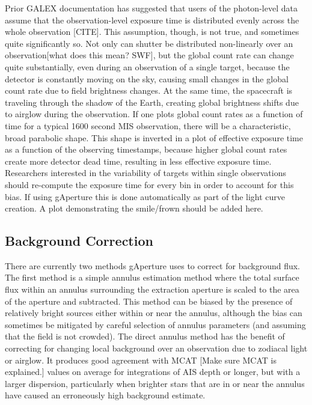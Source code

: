 \documentclass[5p]{elsarticle}
\begin{document}
Prior GALEX documentation has suggested that users of the photon-level data assume that the observation-level exposure time is distributed evenly across the whole observation {\color{red}[CITE]}. This assumption, though, is not true, and sometimes quite significantly so. Not only can shutter be distributed non-linearly over an observation{\color{red}[what does this mean? SWF]}, but the global count rate can change quite substantially, even during an observation of a single target, because the detector is constantly moving on the sky, causing small changes in the global count rate due to field brightness changes.  At the same time, the spacecraft is traveling through the shadow of the Earth, creating global brightness shifts due to airglow during the observation. If one plots global count rates as a function of time for a typical 1600 second MIS observation, there will be a characteristic, broad parabolic shape.  This shape is inverted in a plot of effective exposure time as a function of the observing timestamps, because higher global count rates create more detector dead time, resulting in less effective exposure time.  Researchers interested in the variability of targets within single observations should re-compute the exposure time for every bin in order to account for this bias.  If using gAperture this is done automatically as part of the light curve creation.  {\color{red}A plot demonstrating the smile/frown should be added here.}

\subsection{Background Correction}
There are currently two methods gAperture uses to correct for background flux.  The first method is a simple annulus estimation method where the total surface flux within an annulus surrounding the extraction aperture is scaled to the area of the aperture and subtracted. This method can be biased by the presence of relatively bright sources either within or near the annulus, although the bias can sometimes be mitigated by careful selection of annulus parameters (and assuming that the field is not crowded). The direct annulus method has the benefit of correcting for changing local background over an observation due to zodiacal light or airglow. It produces good agreement with MCAT {\color{red}[Make sure MCAT is explained.]} values on average for integrations of AIS depth or longer, but with a larger dispersion, particularly when brighter stars that are in or near the annulus have caused an erroneously high background estimate.
\end{document}
